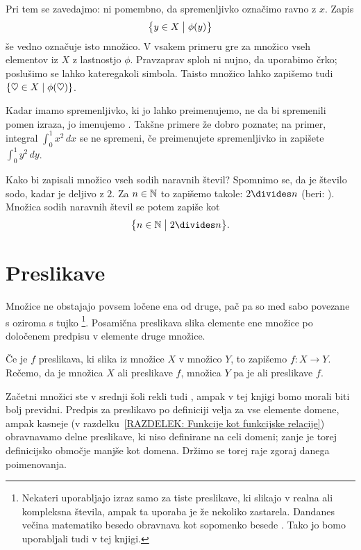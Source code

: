 		Pri tem se zavedajmo: ni pomembno, da spremenljivko označimo ravno z $x$. Zapis
		\[\set[1]{y \in X}{\phi(y)}\]
		še vedno označuje isto množico. V vsakem primeru gre za množico vseh elementov iz $X$ z lastnostjo $\phi$. Pravzaprav sploh ni nujno, da uporabimo črko; poslušimo se lahko kateregakoli simbola. Taisto množico lahko zapišemo tudi $\set{\heartsuit \in X}{\phi(\heartsuit)}$.
		
		Kadar imamo spremenljivko, ki jo lahko preimenujemo, ne da bi spremenili pomen izraza, jo imenujemo . Takšne primere že dobro poznate; na primer, integral $\int_0^1 x^2 \,dx$ se ne spremeni, če preimenujete spremenljivko in zapišete $\int_0^1 y^2 \,dy$.
		
		\begin{zgled}
			Kako bi zapisali množico vseh sodih naravnih števil? Spomnimo se, da je število sodo, kadar je deljivo z $2$. Za $n \in \mathbb{N}$ to zapišemo takole: $2 \divides n$ (beri: ). Množica sodih naravnih števil se potem zapiše kot
			\[\set[1]{n \in \NN}{2 \divides n}.\]
		\end{zgled}
	
	
	\section{Preslikave}
	
		Množice ne obstajajo povsem ločene ena od druge, pač pa so med sabo povezane s  oziroma s tujko \footnote{Nekateri uporabljajo izraz  samo za tiste preslikave, ki slikajo v realna ali kompleksna števila, ampak ta uporaba je že nekoliko zastarela. Dandanes večina matematiko besedo  obravnava kot sopomenko besede . Tako jo bomo uporabljali tudi v tej knjigi.}. Posamična preslikava slika elemente ene množice po določenem predpisu v elemente druge množice.
		
		Če je $f$ preslikava, ki slika iz množice $X$ v množico $Y$, to zapišemo $f\colon X \to Y$. Rečemo, da je množica $X$  ali  preslikave $f$, množica $Y$ pa je  ali  preslikave $f$. 
		
		Začetni množici ste v srednji šoli rekli tudi , ampak v tej knjigi bomo morali biti bolj previdni. Predpis za preslikavo po definiciji velja za vse elemente domene, ampak kasneje (v razdelku~\ref{RAZDELEK: Funkcije kot funkcijske relacije}) obravnavamo delne preslikave, ki niso definirane na celi domeni; zanje je torej definicijsko območje manjše kot domena. Držimo se torej raje zgoraj danega poimenovanja.
		
